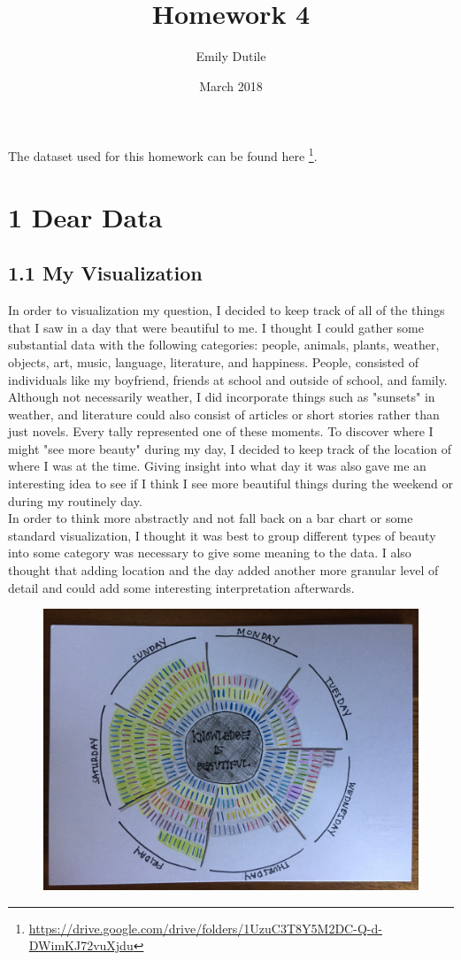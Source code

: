 \documentclass{neu_handout}
\title{Homework 4}
\author{Emily Dutile}
\date{March 2018}
\begin{document}
The dataset used for this homework can be found here \footnote{\url{https://drive.google.com/drive/folders/1UzuC3T8Y5M2DC-Q-d-DWimKJ72vuXjdu}}.

\section*{1 Dear Data}

\subsection*{1.1 My Visualization}

In order to visualization my question, I decided to keep track of all of the things that I saw in a day that were beautiful to me. I thought I could gather some substantial data with the following categories: people, animals, plants, weather, objects, art, music, language, literature, and happiness. People, consisted of individuals like my boyfriend, friends at school and outside of school, and family. Although not necessarily weather, I did incorporate things such as "sunsets" in weather, and literature could also consist of articles or short stories rather than just novels. Every tally represented one of these moments. To discover where I might "see more beauty" during my day, I decided to keep track of the location of where I was at the time. Giving insight into what day it was also gave me an interesting idea to see if I think I see more beautiful things during the weekend or during my routinely day.\\

In order to think more abstractly and not fall back on a bar chart or some standard visualization, I thought it was best to group different types of beauty into some category was necessary to give some meaning to the data. I also thought that adding location and the day added another more granular level of detail and could add some interesting interpretation afterwards.

\begin{figure}[h]
\centering
{
\includegraphics[width=0.4\linewidth]{myviz1}
}
\end{figure}
\end{document}
